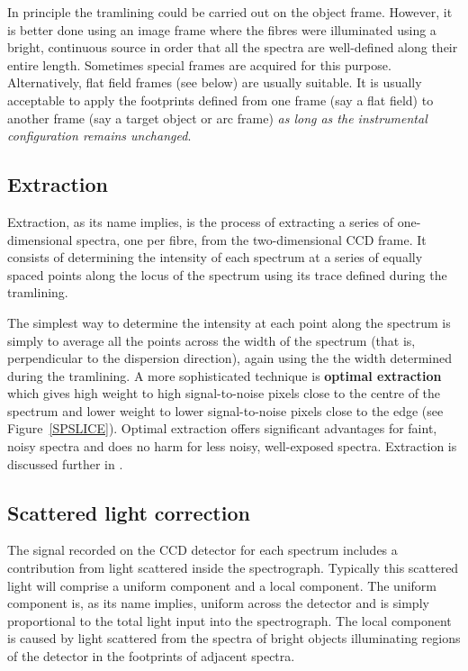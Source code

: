 \documentclass[twoside,11pt]{starlink}
\begin{document}
In principle the tramlining could be carried out on the object
frame.  However, it is better done using an image frame where the
fibres were illuminated using a bright, continuous source in order that
all the spectra are well-defined along their entire length.  Sometimes
special frames are acquired for this purpose.  Alternatively, flat
field frames (see below) are usually suitable.  It is usually
acceptable to apply the footprints defined from one frame (say a flat
field) to another frame (say a target object or arc frame) \textit{as long
as the instrumental configuration remains unchanged}.

\subsection{Extraction}

Extraction, as its name implies, is the process of extracting a series
of one-dimensional spectra, one per fibre, from the two-dimensional
CCD frame.  It consists of determining the intensity of each spectrum
at a series of equally spaced points along the locus of the spectrum
using its trace defined during the tramlining.

The simplest way to determine the intensity at each point along the
spectrum is simply to average all the points across the width of
the spectrum (that is, perpendicular to the dispersion direction),
again using the the width determined during the tramlining.  A more
sophisticated technique is \textbf{optimal extraction} which gives high
weight to high signal-to-noise pixels close to the centre of the
spectrum and lower weight to lower signal-to-noise pixels close to the
edge (see Figure~\ref{SPSLICE}).  Optimal extraction offers significant
advantages for faint, noisy spectra and does no harm for less noisy,
well-exposed spectra.  Extraction is discussed further in
.

\subsection{\label{SCATTER}Scattered light correction}

The signal recorded on the CCD detector for each spectrum includes a
contribution from light scattered inside the spectrograph.  Typically
this scattered light will comprise a uniform component and a local
component.  The uniform component is, as its name implies, uniform across
the detector and is simply proportional to the total light input into the
spectrograph.  The local component is caused by light scattered from
the spectra of bright objects illuminating regions of the detector
in the footprints of adjacent spectra.
\end{document}
